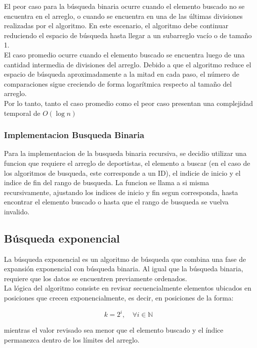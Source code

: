 El peor caso para la búsqueda binaria ocurre cuando el elemento buscado no se encuentra en el arreglo, o cuando se encuentra en una de las últimas divisiones 
realizadas por el algoritmo. En este escenario, el algoritmo debe continuar reduciendo el espacio de búsqueda hasta llegar a un subarreglo vacío o de tamaño 1. \\

El caso promedio ocurre cuando el elemento buscado se encuentra luego de una cantidad intermedia de divisiones del arreglo.  Debido a que el algoritmo reduce el 
espacio de búsqueda aproximadamente a la mitad en cada paso, el número de comparaciones sigue creciendo de forma logarítmica respecto al tamaño del arreglo. \\

Por lo tanto, tanto el caso promedio como el peor caso presentan una complejidad temporal de $O(\log n)$

\subsubsection{Implementacion Busqueda Binaria}
Para la implementacion de la busqueda binaria recursiva, se decidio utilizar una funcion que requiere el arreglo de deportistas, el elemento a buscar (en el caso 
de los algoritmos de busqueda, este corresponde a un ID), el indicie de inicio y el indice de fin del rango de busqueda.  La funcion se llama a si misma recursivamente, 
ajustando los indices de inicio y fin segun corresponda, hasta encontrar el elemento buscado o hasta que el rango de busqueda se vuelva invalido.




\subsection{Búsqueda exponencial}

La búsqueda exponencial es un algoritmo de búsqueda que combina una fase de expansión exponencial con búsqueda binaria. Al igual que la búsqueda binaria, 
requiere que los datos se encuentren previamente ordenados. \\

La lógica del algoritmo consiste en revisar secuencialmente elementos ubicados en posiciones que crecen exponencialmente, es decir, en posiciones de la forma:

\[
k = 2^i, \quad \forall i \in \mathbb{N}
\]

mientras el valor revisado sea menor que el elemento buscado y el índice permanezca dentro de los límites del arreglo.  \\

